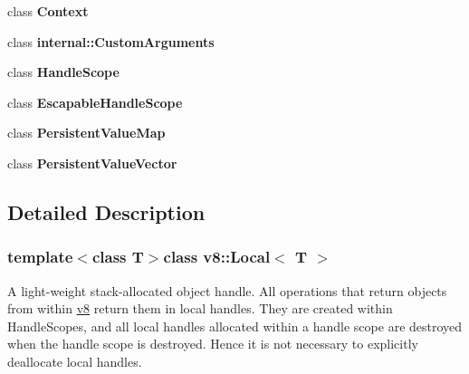 \begin{DoxyCompactItemize}
\item 
\hypertarget{classv8_1_1Local_ac26c806e60ca4a0547680edb68f6e39b}{class {\bfseries Context}}\label{classv8_1_1Local_ac26c806e60ca4a0547680edb68f6e39b}

\item 
\hypertarget{classv8_1_1Local_a113ae8505b55a0ab4897d8fcbf8c7880}{class {\bfseries internal\-::\-Custom\-Arguments}}\label{classv8_1_1Local_a113ae8505b55a0ab4897d8fcbf8c7880}

\item 
\hypertarget{classv8_1_1Local_a5f127e488db492b05c8542cec0b880b7}{class {\bfseries Handle\-Scope}}\label{classv8_1_1Local_a5f127e488db492b05c8542cec0b880b7}

\item 
\hypertarget{classv8_1_1Local_ade20a528f8ee42d426959f061cff29ff}{class {\bfseries Escapable\-Handle\-Scope}}\label{classv8_1_1Local_ade20a528f8ee42d426959f061cff29ff}

\item 
\hypertarget{classv8_1_1Local_aa96af8a34f1f35df272c683a483162da}{class {\bfseries Persistent\-Value\-Map}}\label{classv8_1_1Local_aa96af8a34f1f35df272c683a483162da}

\item 
\hypertarget{classv8_1_1Local_a52baaae342517298950dc5417f1fd4cc}{class {\bfseries Persistent\-Value\-Vector}}\label{classv8_1_1Local_a52baaae342517298950dc5417f1fd4cc}

\end{DoxyCompactItemize}


\subsection{Detailed Description}
\subsubsection*{template$<$class T$>$class v8\-::\-Local$<$ T $>$}

A light-\/weight stack-\/allocated object handle. All operations that return objects from within \hyperlink{namespacev8}{v8} return them in local handles. They are created within Handle\-Scopes, and all local handles allocated within a handle scope are destroyed when the handle scope is destroyed. Hence it is not necessary to explicitly deallocate local handles. 

